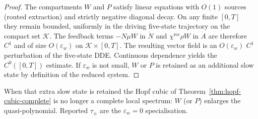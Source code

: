 \documentclass[11pt]{article}
\theoremstyle{definition}
\begin{document}
\begin{proof}
The compartments $W$ and $P$ satisfy linear equations with $O(1)$ sources (routed extraction) and strictly negative diagonal decay. On any finite $[0,T]$ they remain bounded, uniformly in the driving five-state trajectory on the compact set $\mathcal K$. The feedback terms $-N\mu W$ in $\dot N$ and $\chi^{\mathrm{rec}}\rho W$ in $\dot A$ are therefore $C^1$ and of size $O(\varepsilon_w)$ on $\mathcal K\times[0,T]$. The resulting vector field is an $O(\varepsilon_w)$ $C^1$ perturbation of the five-state DDE. Continuous dependence \cite[Ch.~2]{hale1993} yields the $C^0([0,T])$ estimate. If $\varepsilon_w$ is not small, $W$ or $P$ is retained as an additional slow state by definition of the reduced system.
\end{proof}
When that extra slow state is retained the Hopf cubic of Theorem~\ref{thm:hopf-cubic-complete} is no longer a complete local spectrum: $W$ (or $P$) enlarges the quasi-polynomial. Reported $\tau_\pm$ are the $\varepsilon_w=0$ specialisation.
\end{document}
